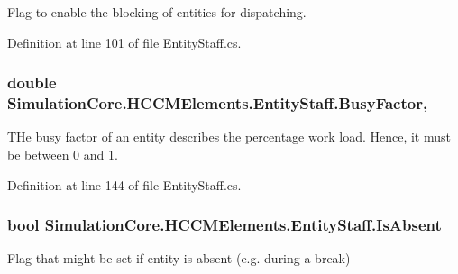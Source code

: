 Flag to enable the blocking of entities for dispatching. 



Definition at line 101 of file Entity\+Staff.\+cs.

\subsubsection[{\texorpdfstring{Busy\+Factor}{BusyFactor}}]{\setlength{\rightskip}{0pt plus 5cm}double Simulation\+Core.\+H\+C\+C\+M\+Elements.\+Entity\+Staff.\+Busy\+Factor\hspace{0.3cm}{\ttfamily [get]}, {\ttfamily [set]}}\hypertarget{class_simulation_core_1_1_h_c_c_m_elements_1_1_entity_staff_ad945e0ffac4e28487c5b5b4c9abdbda8}{}\label{class_simulation_core_1_1_h_c_c_m_elements_1_1_entity_staff_ad945e0ffac4e28487c5b5b4c9abdbda8}


T\+He busy factor of an entity describes the percentage work load. Hence, it must be between 0 and 1. 



Definition at line 144 of file Entity\+Staff.\+cs.

\subsubsection[{\texorpdfstring{Is\+Absent}{IsAbsent}}]{\setlength{\rightskip}{0pt plus 5cm}bool Simulation\+Core.\+H\+C\+C\+M\+Elements.\+Entity\+Staff.\+Is\+Absent\hspace{0.3cm}{\ttfamily [get]}}\hypertarget{class_simulation_core_1_1_h_c_c_m_elements_1_1_entity_staff_a3ea1cb0cd0a8749c06b277214e56ac81}{}\label{class_simulation_core_1_1_h_c_c_m_elements_1_1_entity_staff_a3ea1cb0cd0a8749c06b277214e56ac81}


Flag that might be set if entity is absent (e.\+g. during a break) 



